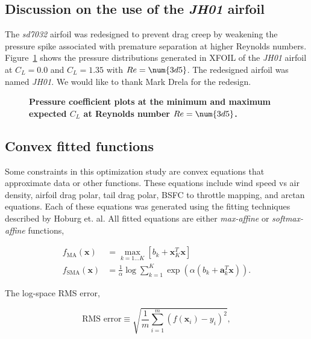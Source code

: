 \subsection{Discussion on the use of the \emph{JH01} airfoil} 

The \emph{sd7032} airfoil was redesigned to prevent drag creep by weakening the pressure spike associated with premature separation at higher Reynolds numbers.  
Figure~\ref{f:jhcps} shows the pressure distributions generated in XFOIL of the \emph{JH01} airfoil at $C_L=0.0$ and $C_L=1.35$ with $Re=\num{3d5}$.
The redesigned airfoil was named \emph{JH01}. We would like to thank Mark Drela for the redesign.

\begin{figure}[h!]
 \begin{subfigmatrix}{2}%
 \end{subfigmatrix}
 \caption{\textbf{Pressure coefficient plots at the minimum and maximum expected $C_L$ at Reynolds number $Re=\num{3d5}$.}}
 \label{f:jhcps}
\end{figure}

\subsection{Convex fitted functions} 

Some constraints in this optimization study are convex equations that approximate data or other functions.  
These equations include wind speed vs air density, airfoil drag polar, tail drag polar, BSFC to throttle mapping, and arctan equations.  
Each of these equations was generated using the fitting techniques described by Hoburg et. al.\cite{fitting} 
All fitted equations are either \emph{max-affine} or \emph{softmax-affine} functions,

\begin{align}
    f_{\text{MA}} (\bm{x}) &= \max\limits_{k=1 \dots K} [b_k + \bm{x}_K^T\bm{x}] \\
    f_{\text{SMA}} (\bm{x}) &= \frac{1}{\alpha} \log{\sum_{k=1}^K \exp{(\alpha(b_k + \bm{a}_k^T \bm{x}))}}.
\end{align}

The log-space RMS error, 

\begin{equation}
\text{RMS error} \equiv \sqrt{\frac{1}{m} \sum_{i=1}^m (f(\bm{x}_i) - y_i)^2},
\end{equation}

